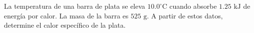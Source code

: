 \item La temperatura de una barra de plata se eleva $10.0 ^\circ\text{C}$ cuando absorbe $1.25 \text{ kJ}$ de energía por calor. La masa de la barra es $525 \text{ g}$. A partir de estos datos, determine el calor específico de la plata.
